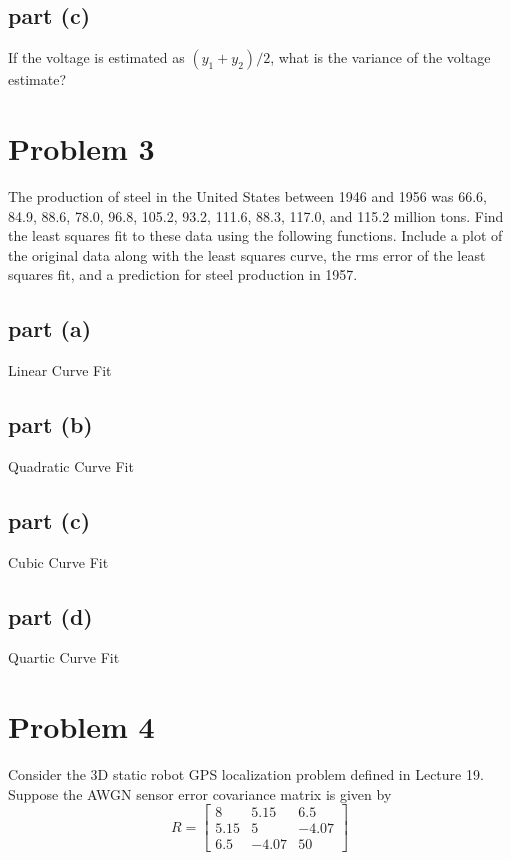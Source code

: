 \documentclass[11pt]{article}
\begin{document}
\subsection*{part (c)}
If the voltage is estimated as $(y_1+y_2)/2$, what is the variance of the voltage estimate?

\section*{Problem 3}
The production of steel in the United States between 1946 and 1956 was 66.6, 84.9, 88.6, 78.0, 96.8, 105.2, 93.2, 111.6, 88.3, 117.0, and 115.2 million tons. Find the least squares fit to these data using the following functions. Include a plot of the original data along with the least squares curve, the rms error of the least squares fit, and a prediction for steel production in 1957.

\subsection*{part (a)}
Linear Curve Fit

\subsection*{part (b)}
Quadratic Curve Fit

\subsection*{part (c)}
Cubic Curve Fit

\subsection*{part (d)}
Quartic Curve Fit

\section*{Problem 4}
Consider the 3D static robot GPS localization problem defined in Lecture 19. Suppose the AWGN sensor error covariance matrix is given by 
\begin{equation*}
	R=\begin{bmatrix} 8 & 5.15 & 6.5 \\ 5.15 & 5 & -4.07 \\ 6.5 & -4.07 & 50 \end{bmatrix}
\end{equation*}
\end{document}
